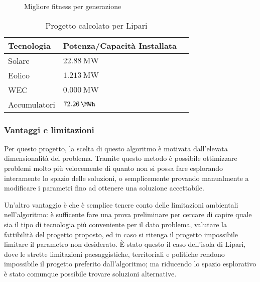 \documentclass[fleqn,11pt]{SelfArx} %
\begin{document}
\begin{figure}[ht]\centering
	\caption{Migliore fitness per generazione}
	\label{fig:fitness}
\end{figure}

\begin{table}[H]
	\caption{Progetto calcolato per Lipari}
	\centering
	\begin{tabular}{llc}
		\toprule
		Tecnologia   & Potenza/Capacità Installata \\
		\midrule
		Solare       & \(\SI{22.88}{\MW}\)         \\
		Eolico       & \(\SI{1.213}{\MW}\)         \\
		WEC          & \(\SI{0.000}{\MW}\)         \\
		Accumulatori & \(\SI{72.26}{\MWh}\)       \\
		\bottomrule
	\end{tabular}
	\label{tab:unbound_lipari}
\end{table}

\subsubsection{Vantaggi e limitazioni}
Per questo progetto, la scelta di questo algoritmo è motivata dall'elevata dimensionalità del problema.
Tramite questo metodo è possibile ottimizzare problemi molto più velocemente di quanto non si possa fare esplorando interamente lo spazio delle soluzioni, o semplicemente provando manualmente a modificare i parametri fino ad ottenere una soluzione accettabile. 

Un'altro vantaggio è che è semplice tenere conto delle limitazioni ambientali nell'algoritmo: è sufficente fare una prova preliminare per cercare di capire quale sia il tipo di tecnologia più conveniente per il dato problema, valutare la fattibilità del progetto proposto, ed in caso si ritenga il progetto impossibile limitare il parametro non desiderato.
È stato questo il caso dell'isola di Lipari, dove le strette limitazioni paesaggistiche, territoriali e politiche rendono impossibile il progetto preferito dall'algoritmo; ma riducendo lo spazio esplorativo è stato comunque possibile trovare soluzioni alternative.
\end{document}
